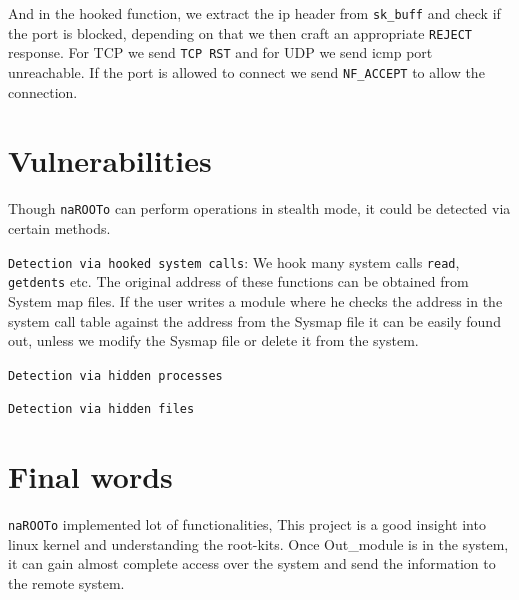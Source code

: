 \documentclass[10pt, letterpaper]{scrartcl}
\begin{document}
And in the hooked function, we extract the ip header from \texttt{sk\_buff} and check if the port is blocked, depending on that we then craft an appropriate \texttt{REJECT} response. For TCP we send \texttt{TCP RST} and for UDP we send icmp port unreachable. If the port is allowed to connect we send \texttt{NF\_ACCEPT} to allow the connection.

\section{Vulnerabilities}
Though \texttt{naROOTo} can perform operations in stealth mode, it could be detected via certain methods. 

\texttt{Detection via hooked system calls}: We hook many system calls \texttt{read}, \texttt{getdents} etc. 
The original address of these functions can be obtained from System map files. 
If the user writes a module where he checks the address in the system call table against the address from the Sysmap file it can be easily found out, unless we modify the Sysmap file or delete it from the system. 

\texttt{Detection via hidden processes}

\texttt{Detection via hidden files}

\section{Final words}
\texttt{naROOTo} implemented lot of functionalities, This project is a good insight into linux kernel and understanding the root-kits.
Once Out\_module is in the system, it can gain almost complete access over the system and send the information to the remote system. 
\end{document}
